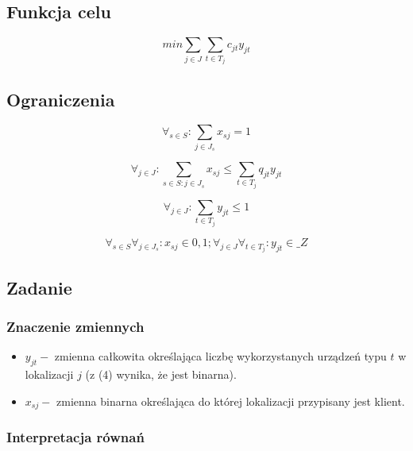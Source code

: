 \documentclass{article}
\begin{document}
\subsection{Funkcja celu}

\begin{equation}
min \sum_{j \in J} \sum_{t \in T_j} c_{jt}y_{jt}
\end{equation}

\subsection{Ograniczenia}

\begin{equation}
  \forall_{s \in {S}} : \sum_{j \in J_s} x_{sj} = 1
\end{equation}

\begin{equation}
  \forall_{j \in J} : \sum_{s \in S : j \in J_s } x_{sj} \leq \sum_{t \in T_j} q_{jt}y_{jt}
\end{equation}

\begin{equation}
  \forall_{j \in J} : \sum_{t \in T_j} y_{jt} \leq 1
\end{equation}

\begin{equation*}
  \forall_{s \in S} \forall_{j \in J_s} : x_{sj} \in {0,1}; \forall_{j \in J} \forall_{t \in T_j}: y_{jt} \in \mathbb_{Z}
\end{equation*}

\subsection{Zadanie}

\subsubsection{Znaczenie zmiennych}

\begin{itemize}
  \item $y_{jt} - $ zmienna całkowita określająca liczbę wykorzystanych urządzeń typu $t$ w lokalizacji $j$ (z (4) wynika, że jest binarna).
  \item $x_{sj} - $ zmienna binarna określająca do której lokalizacji przypisany jest klient.
\end{itemize}

\subsubsection{Interpretacja równań}
\end{document}
